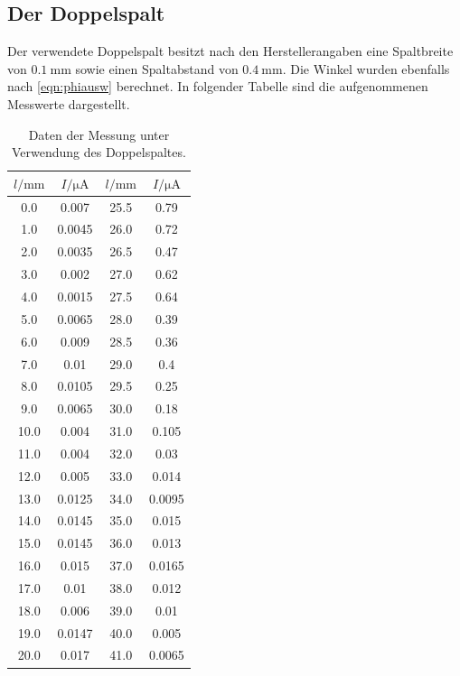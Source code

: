\subsection{Der Doppelspalt}
Der verwendete Doppelspalt besitzt nach den Herstellerangaben eine Spaltbreite von
$\SI{0.1}{\milli\meter}$ sowie einen Spaltabstand von $\SI{0.4}{\milli\meter}$.
Die Winkel wurden ebenfalls nach \eqref{eqn:phiausw} berechnet.
In folgender Tabelle sind die aufgenommenen Messwerte dargestellt.
\begin{table}[H]
  \centering
    \caption{Daten der Messung unter Verwendung des Doppelspaltes.}
    \label{tab:doppelspalt1}
    \begin{tabular}
      {S S[table-format=1.5] S S[table-format=1.5]}
      \toprule
      {$l / \si{\milli\meter}$} & {$I / \si{\micro\ampere}$} & {$l / \si{\milli\meter}$} & {$I / \si{\micro\ampere}$} \\
        & 0.007    & 25.5 & 0.79  \\
      1.0  & 0.0045   & 26.0 & 0.72  \\
      2.0  & 0.0035   & 26.5 & 0.47  \\
      3.0  & 0.002    & 27.0 & 0.62  \\
      4.0  & 0.0015   & 27.5 & 0.64  \\
      5.0  & 0.0065   & 28.0 & 0.39  \\
      6.0  & 0.009    & 28.5 & 0.36  \\
      7.0  & 0.01     & 29.0 & 0.4  \\
      8.0  & 0.0105   & 29.5 & 0.25  \\
      9.0  & 0.0065   & 30.0 & 0.18  \\
      10.0 & 0.004    & 31.0 & 0.105  \\
      11.0 & 0.004    & 32.0 & 0.03  \\
      12.0 & 0.005    & 33.0 & 0.014  \\
      13.0 & 0.0125   & 34.0 & 0.0095  \\
      14.0 & 0.0145   & 35.0 & 0.015  \\
      15.0 & 0.0145   & 36.0 & 0.013  \\
      16.0 & 0.015    & 37.0 & 0.0165  \\
      17.0 & 0.01     & 38.0 & 0.012  \\
      18.0 & 0.006    & 39.0 & 0.01  \\
      19.0 & 0.0147   & 40.0 & 0.005  \\
      20.0 & 0.017    & 41.0 & 0.0065  \\

\end{tabular}
\end{table}
